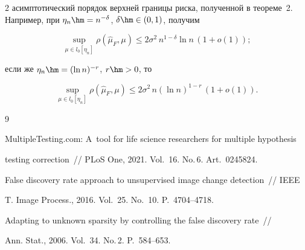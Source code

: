 \begin{multicols}{2}
асимптотический порядок верхней границы риска, полученной в тео\-ре\-ме~2. Например, при $\eta_n\hm = n^{-\delta}$, $\delta\hm\in(0,1)$, получим

$$

\sup\limits_{\mu\in l_0[\eta_n]}\rho(\hat{\mu}_F, \mu)  \leq 2\sigma^2 \, 

n^{1-\delta} \ln n \, (1+o(1));

$$

если же $\eta_n\hm = (\ln n)^{-r}$, $r\hm>0$, то

$$

\sup\limits_{\mu\in l_0[\eta_n]}\rho(\hat{\mu}_F, \mu)  \leq 2\sigma^2 \, n 

(\ln n)^{1-r} \, (1+o(1)).

$$





{\small\frenchspacing

 {%


 \begin{thebibliography}{9}



MultipleTesting.com: A~tool for life science researchers for multiple hypothesis 

testing correction~// PLoS One, 2021. Vol.~16. No.\,6. Art.~0245824.





False discovery rate approach to unsupervised image change detection~// IEEE 

T. Image Process., 2016. Vol.~25. No.~10. P.~4704--4718.





Adapting to unknown sparsity by controlling the false discovery rate~//  

Ann. Stat., 2006. Vol.~34. No.\,2. P.~584--653.






\end{thebibliography}}}
\end{multicols}
